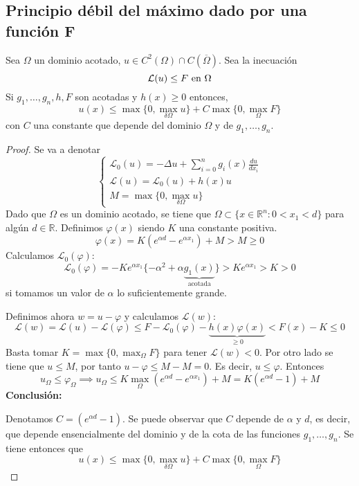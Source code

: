 \subsection{Principio débil del máximo dado por una función F}
\begin{theorem}
Sea $\Omega$ un dominio acotado, $u\in C^2(\Omega)\cap C(\overline{\Omega})$. 
Sea la inecuación
$$\mathcal{L}(u) \le F  \text{ en } \Omega\\$$
Si $g_1,\hdots,g_n,h,F$ son acotadas y $h(x) \ge 0$ entonces,
$$u(x) \le \max\{0, \max_{\delta\Omega}u\} + C\max\{0, \max_{\Omega} F\}$$
con $C$ una constante que depende del dominio $\Omega$ y de $g_1,\hdots,g_n$.
\end{theorem}
\begin{proof}
Se va a denotar
\begin{equation*}
\left\{
\begin{array}{l}
\mathcal{L}_0(u)=-\Delta u+\sum_{i=0}^ng_i(x)\frac{du}{dx_i}\\
\mathcal{L}(u) = \mathcal{L}_0(u)+h(x)u\\
M=\max\{0,\max_{\delta\Omega}u\}
\end{array}
\right.
\end{equation*}
Dado que $\Omega$ es un dominio acotado, se tiene que
$\Omega\subset\{x\in\mathbb{R}^n: 0<x_1<d\}$ para algún $d\in\mathbb{R}$.
Definimos $\varphi(x)$ siendo $K$ una constante positiva.
$$\varphi(x)=K\left(e^{\alpha d}-e^{\alpha x_1}\right)+M > M \ge 0$$
Calculamos $\mathcal{L}_0(\varphi)$:
$$\mathcal{L}_0(\varphi)=-Ke^{\alpha x_1}\{-\alpha^2+\alpha \underbrace{g_1(x)}_{\text{acotada}}\}>Ke^{\alpha x_1} > K > 0$$
si tomamos un valor de $\alpha$ lo suficientemente grande.

\noindent Definimos ahora $w=u-\varphi$ y calculamos $\mathcal{L}(w)$:
$$\mathcal{L}(w) = \mathcal{L}(u)-\mathcal{L}(\varphi) \le F - \mathcal{L}_0(\varphi)-\underbrace{h(x)\varphi(x)}_{\ge0}<F(x)-K \le 0$$
Basta tomar $K=\max\{0, \max_{\Omega}F\}$ para tener $\mathcal{L}(w) < 0$.
Por otro lado se tiene que $u\le M$, por tanto $u-\varphi\le M - M = 0$. Es decir, $u \le \varphi$. Entonces 
$$u_\Omega \le \varphi_\Omega\implies u_\Omega \le K\max_\Omega\left(e^{\alpha d}-e^{\alpha x_1}\right) + M = K\left(e^{\alpha d}-1\right) + M$$
\textbf{Conclusión:}

Denotamos $C = \left(e^{\alpha d}-1\right)$. Se puede observar que $C$ depende de $\alpha$ y $d$, es decir, que depende ensencialmente del dominio y de la cota de las funciones $g_1,\hdots,g_n$.
Se tiene entonces que 
$$u(x) \le \max\{0, \max_{\delta\Omega}u\} + C\max\{0, \max_{\Omega} F\}$$
\end{proof}

